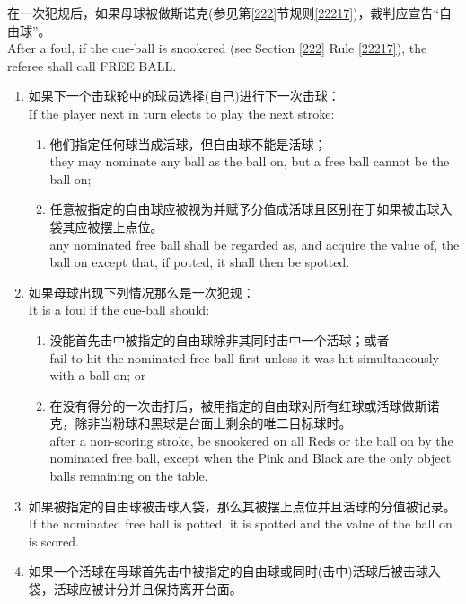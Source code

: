 \noindent 在一次犯规后，如果母球被做斯诺克(参见第\ref{222}节规则\ref{22217})，裁判应宣告``自由球''。\\
After a foul, if the cue-ball is snookered (see Section \ref{222} Rule \ref{22217}), the referee shall call FREE BALL.
\begin{enumerate}[label=(\alph*)]
    \item 如果下一个击球轮中的球员选择(自己)进行下一次击球：\\
    If the player next in turn elects to play the next stroke:
    \begin{enumerate}[label=(\roman*)]
        \item 他们指定任何球当成活球，但自由球不能是活球；\\
        they may nominate any ball as the ball on, but a free ball cannot be the ball on;
        \item 任意被指定的自由球应被视为并赋予分值成活球且区别在于如果被击球入袋其应被摆上点位。\\
        any nominated free ball shall be regarded as, and acquire the value of, the ball on except that, if potted, it shall then be spotted.
    \end{enumerate}
    \item \label{22312b}如果母球出现下列情况那么是一次犯规：\\
    It is a foul if the cue-ball should:
    \begin{enumerate}[label=(\roman*)]
        \item 没能首先击中被指定的自由球除非其同时击中一个活球；或者\\
        fail to hit the nominated free ball first unless it was hit simultaneously with a ball on; or
        \item \label{22312bii}在没有得分的一次击打后，被用指定的自由球对所有红球或活球做斯诺克，除非当粉球和黑球是台面上剩余的唯二目标球时。\\
        after a non-scoring stroke, be snookered on all Reds or the ball on by the nominated free ball, except when the Pink and Black are the only object balls remaining on the table.
    \end{enumerate}
    \item 如果被指定的自由球被击球入袋，那么其被摆上点位并且活球的分值被记录。\\
    If the nominated free ball is potted, it is spotted and the value of the ball on is scored.
    \item 如果一个活球在母球首先击中被指定的自由球或同时(击中)活球后被击球入袋，活球应被计分并且保持离开台面。\\

\end{enumerate}
